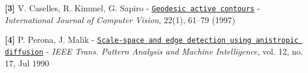 {\bfseries \mbox{[}3\mbox{]}} V. Caselles, R. Kimmel, G. Sapiro -\/ \href{https://docs.google.com/viewer?a=v&pid=explorer&chrome=true&srcid=0Bzx5IoqehNE_ZWEzNzk2ZjgtNzlkMi00NDY0LTkzZjQtYWQ5N2EyNDA5NGE3&hl=en&authkey=CKi1w7cE}{\tt Geodesic active contours} -\/ {\itshape International Journal of Computer Vision}, 22(1), 61–79 (1997)

{\bfseries \mbox{[}4\mbox{]}} P. Perona, J. Malik -\/ \href{https://docs.google.com/viewer?a=v&pid=explorer&chrome=true&srcid=0Bzx5IoqehNE_NmJmZWZkM2ItN2ZhZS00NjA4LTk3Y2UtNTNmYzkxYjFjNjU4&hl=en&authkey=CPDnxN8H}{\tt Scale-\/space and edge detection using anistropic diffusion} -\/ {\itshape I\-E\-E\-E Trans. Pattern Analysis and Machine Intelligence}, vol. 12, no. 17, Jul 1990